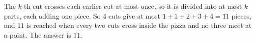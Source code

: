 The $k$-th cut crosses each earlier cut at most once, so it is divided into at most $k$ parts, each adding one piece. So $4$ cuts give at most $1+1+2+3+4=11$ pieces, and $11$ is reached when every two cuts cross inside the pizza and no three meet at a point. The answer is $\boxed{11}$.

